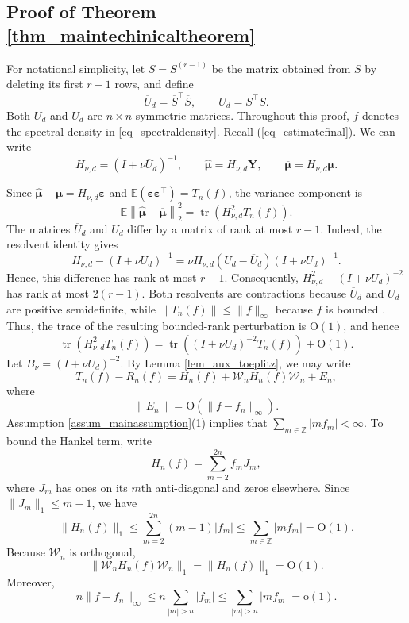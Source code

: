 \documentclass[11pt]{article}
\numberwithin{equation}{section}
\numberwithin{figure}{section}
\begin{document}
\subsection{Proof of Theorem \ref{thm_maintechinicaltheorem}}\label{appendix_techinmain}

For notational simplicity, let $\overline S=S^{(r-1)}$
be the matrix obtained from \(S\) by deleting its first \(r-1\) rows, and define
\begin{equation*}
\overline U_d=\overline S^\top\overline S,
\qquad
U_d=S^\top S.
\end{equation*}
Both \(\overline U_d\) and \(U_d\) are \(n\times n\) symmetric matrices. Throughout this proof, \(f\) denotes the spectral density in \eqref{eq_spectraldensity}. Recall (\ref{eq_estimatefinal}). We can write
\begin{equation*}
H_{\nu,d}=(I+\nu\overline U_d)^{-1},
\qquad
\widehat{\bm{\mu}}=H_{\nu,d}\bm{Y},
\qquad
\overline{\bm{\mu}}=H_{\nu,d}\bm{\mu}.
\end{equation*}

Since \(\widehat{\bm{\mu}}-\overline{\bm{\mu}}=H_{\nu,d}\bm{\varepsilon}\) and \(\mathbb{E}(\bm{\varepsilon}\bm{\varepsilon}^\top)=T_n(f)\), the variance component is
\begin{equation*}
\mathbb{E}\left\|
\widehat{\bm{\mu}}-\overline{\bm{\mu}}
\right\|_2^2
=
\operatorname{tr}\!\left(
H_{\nu,d}^2T_n(f)
\right).
\end{equation*}
The matrices \(\overline U_d\) and \(U_d\) differ by a matrix of rank at most \(r-1\). Indeed, the resolvent identity gives
\begin{equation*}
\mathit{H}_{\nu,d}-(I+\nu U_d)^{-1}
=
\nu\mathit{H}_{\nu,d}(U_d-\overline U_d)(I+\nu U_d)^{-1}.
\end{equation*}
Hence, this difference has rank at most \(r-1\). Consequently,
\(\mathit{H}_{\nu,d}^2-(I+\nu U_d)^{-2}\) has rank at most \(2(r-1)\). Both resolvents are contractions because \(\overline U_d\) and \(U_d\) are positive semidefinite, while \(\|T_n(f)\|\leq\|f\|_\infty\) because \(f\) is bounded \cite{grenander_szego_1958}. Thus, the trace of the resulting bounded-rank perturbation is \(\mathrm{O}(1)\), and hence
\begin{equation*}
\operatorname{tr}\!\left(
H_{\nu,d}^2T_n(f)
\right)
=
\operatorname{tr}\!\left(
(I+\nu U_d)^{-2}T_n(f)
\right)
+
\mathrm{O}(1).
\end{equation*}
Let $B_\nu=(I+\nu U_d)^{-2}.$ By Lemma \ref{lem_aux_toeplitz}, we may write
\[
T_n(f)-R_n(f)
=
H_n(f)+\mathcal{W}_nH_n(f)\mathcal{W}_n+E_n,
\]
where
\[
\|E_n\|
=
\mathrm{O}\!\left(\|f-f_n\|_\infty\right).
\]
Assumption \ref{assum_mainassumption}(1) implies that
\(\sum_{m\in\mathbb{Z}}|m f_m|<\infty\). To bound the Hankel term, write
\[
H_n(f)=\sum_{m=2}^{2n}f_mJ_m,
\]
where \(J_m\) has ones on its \(m\)th anti-diagonal and zeros elsewhere.
Since \(\|J_m\|_1\leq m-1\), we have
\[
\|H_n(f)\|_1
\leq
\sum_{m=2}^{2n}(m-1)|f_m|
\leq
\sum_{m\in\mathbb{Z}}|m f_m|
=
\mathrm{O}(1).
\]
Because \(\mathcal{W}_n\) is orthogonal,
\[
\|\mathcal{W}_nH_n(f)\mathcal{W}_n\|_1
=
\|H_n(f)\|_1
=
\mathrm{O}(1).
\]
Moreover,
\[
n\|f-f_n\|_\infty
\leq
n\sum_{|m|>n}|f_m|
\leq
\sum_{|m|>n}|m f_m|
=
\mathrm{o}(1).
\]
\end{document}

